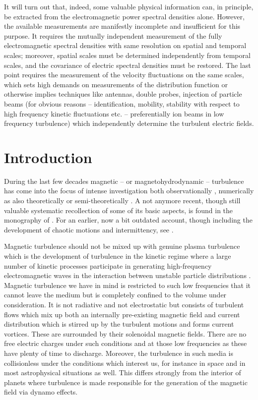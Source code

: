 \documentclass[ ]{copernicus2}
\begin{document}
{It will turn out that, indeed, some valuable physical information can, in principle, be extracted from the electromagnetic power spectral densities alone. However, the available measurements are manifestly incomplete and insufficient for this purpose. It requires the mutually independent measurement of the fully electromagnetic spectral densities with same resolution on spatial and temporal scales; moreover, spatial scales must be determined independently from temporal scales, and the covariance of electric spectral densities must be restored. The last point requires the measurement of the velocity fluctuations on the same scales, which sets high demands on measurements of the distribution function or otherwise implies techniques like antennas, double probes, injection of particle beams (for obvious reasons -- identification, mobility, stability with respect to high frequency kinetic fluctuations etc. -- preferentially ion beams in low frequency turbulence) which independently determine the turbulent electric fields.  

\section{Introduction}
During the last few decades magnetic  -- or magnetohydrodynamic -- turbulence has come into the focus of intense investigation both observationally \citep[for reviews cf., e.g.,][]{goldstein1995}, numerically \citep[cf., as for an example,][]{zhou2004,dmitruk2009} as also theoretically \citep[cf., e.g.,][]{scheko2009,boldyr2013,zank2012} or semi-theoretically \citep[e.g.,][]{sahraoui2012}. A not anymore recent, though still valuable systematic recollection of some of its basic aspects, is found in the monography of \citet{biskamp2003}. For an earlier, now a bit outdated account, though including the development of chaotic motions and intermittency, see \citet{frisch1995}. 

Magnetic turbulence should not be mixed up with genuine plasma turbulence which is the development of turbulence in the kinetic regime where a large number of kinetic processes participate in generating high-frequency electromagnetic waves in the interaction between unstable particle distributions \citep[cf., e.g.,][and references therein]{davidson1972,kadomtsev1965,tsytovich1970,sagdeev1969}. Magnetic turbulence we have in mind is restricted to such low frequencies that it cannot leave the medium but is completely confined to the volume under consideration. It is not radiative and not electrostatic but consists of turbulent flows which mix up both an internally pre-existing magnetic field and current distribution which is stirred up by the turbulent motions and forms current vortices. These are surrounded by their solenoidal magnetic fields. There are no free electric charges under such conditions and at those low frequencies as these have plenty of time to discharge. Moreover, the turbulence in such media is collisionless under the conditions which interest us, for instance in space and in most astrophysical situations as well. This differs strongly from the interior of planets where turbulence is made responsible for the generation of the magnetic field via dynamo effects. 

}
\end{document}
